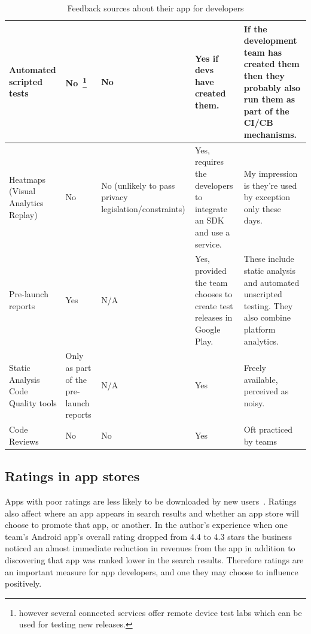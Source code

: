 \begin{table}[H]
\begin{tabular}{L{2cm} L{2.4cm} L{3.5cm} L{2.4cm} L{3.5cm}}
		Automated scripted tests  & No~\footnote{however several connected services offer remote device test labs which can be used for testing new releases.} & No & Yes if devs have created them. & If the development team has created them then they probably also run them as part of the CI/CB mechanisms. \\ \midrule
		Heatmaps (Visual Analytics Replay) & No & No (unlikely to pass privacy legislation/constraints) & Yes, requires the developers to integrate an SDK and use a service. & My impression is they’re used by exception only these days. \\ \midrule
		Pre-launch reports & Yes & N/A & Yes, provided the team chooses to create test releases in Google Play. & These include static analysis and automated unscripted testing. They also combine platform analytics. \\ \midrule
		Static Analysis Code Quality tools & Only as part of the pre-launch reports & N/A & Yes & Freely available, perceived as noisy. \\ \midrule
		Code Reviews & No & No & Yes & Oft practiced by teams \\
		\bottomrule
	\end{tabular}
	\caption{Feedback sources about their app for developers}
	\label{tab:feedback-sources-about-their-app-for-devs}
\end{table}


\vspace{2\baselineskip}

\FloatBarrier
\subsection{Ratings in app stores}
Apps with poor ratings are less likely to be downloaded by new users~. Ratings also affect where an app appears in search results and whether an app store will choose to promote that app, or another. In the author's experience when one team's Android app's overall rating dropped from 4.4 to 4.3 stars the business noticed an almost immediate reduction in revenues from the app in addition to discovering that app was ranked lower in the search results. Therefore ratings are an important measure for app developers, and one they may choose to influence positively. 

